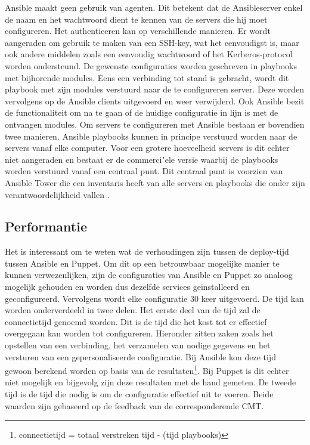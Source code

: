 Ansible maakt geen gebruik van agenten. Dit betekent dat de Ansibleserver enkel de naam en het wachtwoord dient te kennen van de servers die hij moet configureren. Het authenticeren kan op verschillende manieren. Er wordt aangeraden om gebruik te maken van een SSH-key, wat het eenvoudigst is, maar ook andere middelen zoals een eenvoudig wachtwoord of het Kerberos-protocol worden ondersteund. De gewenste configuraties worden geschreven in playbooks met bijhorende modules. Eens een verbinding tot stand is gebracht, wordt dit playbook met zijn modules verstuurd naar de te configureren server. Deze worden vervolgens op de Ansible clients uitgevoerd  en weer verwijderd. Ook Ansible bezit de functionaliteit om na te gaan of de huidige configuratie in lijn is met de ontvangen modules. Om servers te configureren met Ansible bestaan er bovendien twee manieren. Ansible playbooks kunnen in principe verstuurd worden naar de servers vanaf elke computer. Voor een grotere hoeveelheid servers is dit echter niet aangeraden en bestaat er de commerci"ele versie waarbij de playbooks worden verstuurd vanaf een centraal punt. Dit centraal punt is voorzien van Ansible Tower die een inventaris heeft van alle servers en playbooks die onder zijn verantwoordelijkheid vallen \autocite{ansibledoc}.


\subsection{Performantie}

Het is interessant om te weten wat de verhoudingen zijn tussen de deploy-tijd tussen Ansible en Puppet. Om dit op een betrouwbaar mogelijke manier te kunnen verwezenlijken, zijn de configuraties van Ansible en Puppet zo analoog mogelijk gehouden en worden dus dezelfde services ge\"installeerd en geconfigureerd. Vervolgens wordt elke configuratie 30 keer uitgevoerd. De tijd kan worden onderverdeeld in twee delen.\newline
Het eerste deel van de tijd zal de connectietijd genoemd worden. Dit is de tijd die het kost tot er effectief overgegaan kan worden tot configureren. Hieronder zitten zaken zoals het opstellen van een verbinding, het verzamelen van nodige gegevens en het versturen van een gepersonaliseerde configuratie. Bij Ansible kon deze tijd gewoon berekend worden op basis van de resultaten\footnote{connectietijd = totaal verstreken tijd -  \unexpanded{$ \sum  $} (tijd playbooks)}. Bij Puppet is dit echter niet mogelijk en bijgevolg zijn deze resultaten met de hand gemeten.\newline
 De tweede tijd is de tijd die nodig is om de configuratie effectief uit te voeren. Beide waarden zijn gebaseerd op de feedback van de corresponderende CMT.

